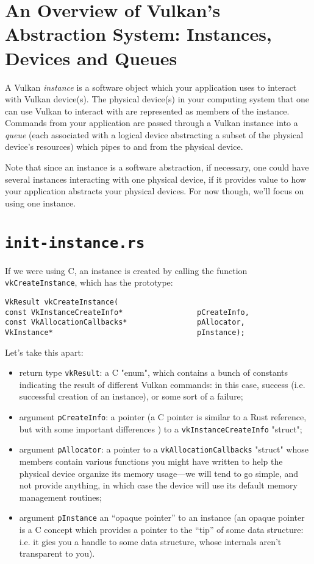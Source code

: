 \documentclass[12pt,letterpaper]{article}
\newcommand{\inquotes}[1]{``#1''}	%
\newcommand{\cil}[1]{\texttt{#1}}
\begin{document}
\section{An Overview of Vulkan's Abstraction System: Instances, Devices and Queues}

	A Vulkan \emph{instance} is a software object which your application uses to interact with Vulkan device(s). The physical device(s) in your computing system that one can use Vulkan to interact with are represented as members of the instance. Commands from your application are passed through a Vulkan instance into a \emph{queue} (each associated with a logical device abstracting a subset of the physical device's resources) which pipes to and from the physical device. 
	
	Note that since an instance is a software abstraction, if necessary, one could have several instances interacting with one physical device, if it provides value to how your application abstracts your physical devices. For now though, we'll focus on using one instance.
	
\section{\texttt{init-instance.rs}}
	
	If we were using C, an instance is created by calling the function \cil{vkCreateInstance}, which has the prototype:
		\begin{verbatim}
VkResult vkCreateInstance(
const VkInstanceCreateInfo*                 pCreateInfo,
const VkAllocationCallbacks*                pAllocator,
VkInstance*                                 pInstance);
		\end{verbatim}
		
	Let's take this apart:
		\begin{itemize}
			\item return type \cil{vkResult}: a C "enum", which contains a bunch of  constants indicating the result of different Vulkan commands: in this case, success (i.e. successful creation of an instance), or some sort of a failure;
			
			\item argument \cil{pCreateInfo}: a pointer (a C pointer is similar to a Rust reference, but with some important differences ) to a \cil{vkInstanceCreateInfo} "struct";
			
			\item argument \cil{pAllocator}: a pointer to a \cil{vkAllocationCallbacks} "struct" whose members contain various functions you might have written to help the physical device organize its memory usage---we will tend to go simple, and not provide anything, in which case the device will use its default memory management routines;
			
			\item argument \cil{pInstance} an \inquotes{opaque pointer} to an instance (an opaque pointer is a C concept which provides a pointer to the \inquotes{tip} of some data structure: i.e. it gies you a handle to some data structure, whose internals aren't transparent to you).
		\end{itemize}
	
\end{document}
